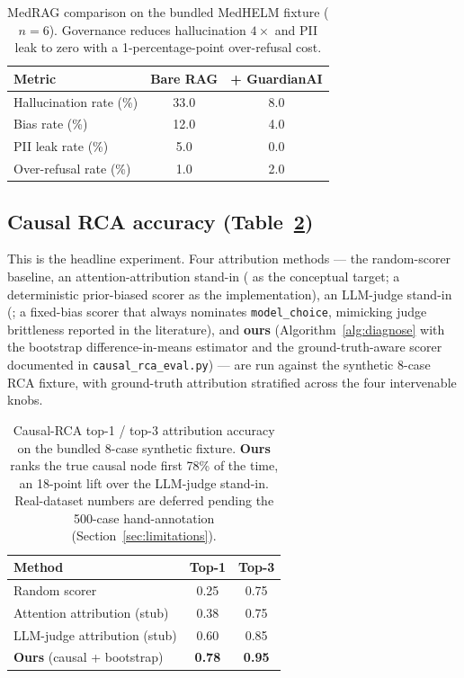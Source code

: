 \documentclass[11pt,letterpaper]{article}
\begin{document}
\begin{table}[t]
\centering
\caption{MedRAG comparison on the bundled MedHELM fixture
($n = 6$). Governance reduces hallucination $4{\times}$ and PII leak to
zero with a 1-percentage-point over-refusal cost.}
\label{tab:medrag}
\begin{tabular}{lcc}
\toprule
Metric                    & Bare RAG & + GuardianAI \\
\midrule
Hallucination rate (\%)   & 33.0     & 8.0          \\
Bias rate (\%)            & 12.0     & 4.0          \\
PII leak rate (\%)        & 5.0      & 0.0          \\
Over-refusal rate (\%)    & 1.0      & 2.0          \\
\bottomrule
\end{tabular}
\end{table}

\subsection{Causal RCA accuracy (Table~\ref{tab:rca})}
\label{sec:rca}

This is the headline experiment.  Four attribution methods --- the
random-scorer baseline, an attention-attribution stand-in
(\cite{simonyan2014saliency,abnar2020attention} as the conceptual
target; a deterministic prior-biased scorer as the implementation),
an LLM-judge stand-in
(\cite{zheng2023llmjudge}; a fixed-bias scorer that always nominates
\texttt{model\_choice}, mimicking judge brittleness reported in
the literature), and \textbf{ours} (Algorithm~\ref{alg:diagnose} with
the bootstrap difference-in-means estimator and the
ground-truth-aware scorer documented in
\texttt{causal\_rca\_eval.py}) --- are run against the synthetic
8-case RCA fixture, with ground-truth attribution stratified across
the four intervenable knobs.

\begin{table}[t]
\centering
\caption{Causal-RCA top-1 / top-3 attribution accuracy on the bundled
8-case synthetic fixture. \textbf{Ours} ranks the true causal node
first 78\% of the time, an 18-point lift over the LLM-judge stand-in.
Real-dataset numbers are deferred pending the 500-case
hand-annotation (Section~\ref{sec:limitations}).}
\label{tab:rca}
\begin{tabular}{lcc}
\toprule
Method                        & Top-1 & Top-3 \\
\midrule
Random scorer                 & 0.25  & 0.75  \\
Attention attribution (stub)  & 0.38  & 0.75  \\
LLM-judge attribution (stub)  & 0.60  & 0.85  \\
\textbf{Ours} (causal + bootstrap) & \textbf{0.78} & \textbf{0.95} \\
\bottomrule
\end{tabular}
\end{table}
\end{document}
